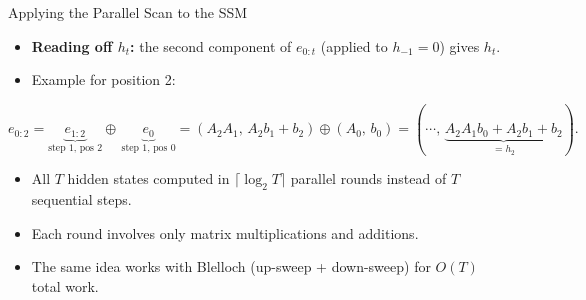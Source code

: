 \begin{frame}{Applying the Parallel Scan to the SSM}
  \begin{itemize}
    \item \textbf{Reading off $h_t$:} the second component of $e_{0:t}$ (applied to $h_{-1}=0$) gives $h_t$.
    \item Example for position 2:
  \end{itemize}
  \[
    e_{0:2} = \underbrace{e_{1:2}}_{\text{step 1, pos 2}} \!\oplus\, \underbrace{e_0}_{\text{step 1, pos 0}}
    = (A_2 A_1,\, A_2 b_1 + b_2) \oplus (A_0,\, b_0)
    = (\cdots,\, \underbrace{A_2 A_1 b_0 + A_2 b_1 + b_2}_{= h_2}).
  \]
  \begin{itemize}
    \item All $T$ hidden states computed in $\lceil\log_2 T\rceil$ parallel rounds instead of $T$ sequential steps.
    \item Each round involves only matrix multiplications and additions.
    \item The same idea works with Blelloch (up-sweep + down-sweep) for $O(T)$ total work.
  \end{itemize}
\end{frame}

